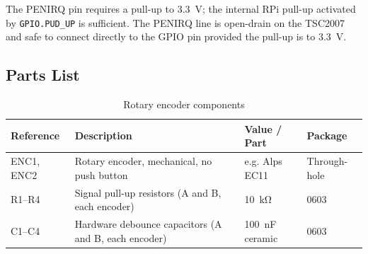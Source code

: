\noindent The PENIRQ pin requires a pull-up to \SI{3.3}{\volt}; the internal
RPi pull-up activated by \texttt{GPIO.PUD\_UP} is sufficient. The PENIRQ line
is open-drain on the TSC2007 and safe to connect directly to the GPIO pin
provided the pull-up is to \SI{3.3}{\volt}.

\subsection{Parts List}

\begin{table}[h]
\centering
\begin{tabular}{llll}
\hline
\textbf{Reference} & \textbf{Description} & \textbf{Value / Part} & \textbf{Package} \\
\hline
ENC1, ENC2  & Rotary encoder, mechanical, no push button & e.g. Alps EC11  & Through-hole \\
R1--R4      & Signal pull-up resistors (A and B, each encoder) & \SI{10}{\kilo\ohm} & 0603 \\
C1--C4      & Hardware debounce capacitors (A and B, each encoder) & \SI{100}{\nano\farad} ceramic & 0603 \\
\hline
\end{tabular}
\caption{Rotary encoder components}
\label{tab:encoder_parts}
\end{table}
